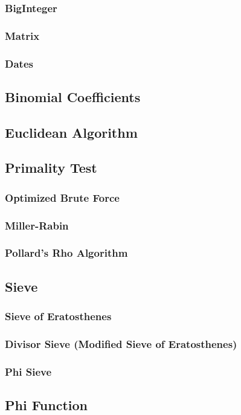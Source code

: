 \documentclass[8pt,a4paper,landscape,oneside]{amsart}
\begin{document}
\begin{multicols*}{3}
		\subsubsection{BigInteger}
		\subsubsection{Matrix}
		\subsubsection{Dates}
	\subsection{Binomial Coefficients}
	\subsection{Euclidean Algorithm}
	\subsection{Primality Test}
		\subsubsection{Optimized Brute Force}
		\subsubsection{Miller-Rabin}
		\subsubsection{Pollard's Rho Algorithm}
	\subsection{Sieve}
		\subsubsection{Sieve of Eratosthenes}
		\subsubsection{Divisor Sieve (Modified Sieve of Eratosthenes)}
		\subsubsection{Phi Sieve}
	\subsection{Phi Function}

\end{multicols*}
\end{document}
